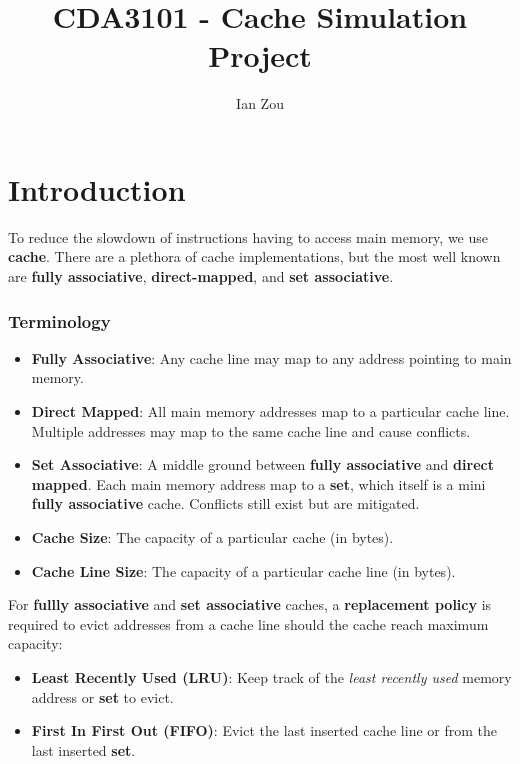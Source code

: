 \documentclass[12pt, letterpaper]{article}
\title{CDA3101 - Cache Simulation Project}
\author{Ian Zou}
\begin{document}
\maketitle

\part{Introduction}

To reduce the slowdown of instructions having to access main memory, we use \textbf{cache}. There are a plethora of cache implementations, but the most well known are \textbf{fully associative}, \textbf{direct-mapped}, and \textbf{set associative}.

\section*{Terminology}

\begin{itemize}
    \item \textbf{Fully Associative}: Any cache line may map to any address pointing to main memory.
    \item \textbf{Direct Mapped}: All main memory addresses map to a particular cache line. Multiple addresses may map to the same cache line and cause conflicts.
    \item \textbf{Set Associative}: A middle ground between \textbf{fully associative} and \textbf{direct mapped}. Each main memory address map to a \textbf{set}, which itself is a mini \textbf{fully associative} cache. Conflicts still exist but are mitigated.
    \item \textbf{Cache Size}: The capacity of a particular cache (in bytes).
    \item \textbf{Cache Line Size}: The capacity of a particular cache line (in bytes).
\end{itemize}
\bigskip

For \textbf{fullly associative} and \textbf{set associative} caches, a \textbf{replacement policy} is required to evict addresses from a cache line should the cache reach maximum capacity:

\begin{itemize}
    \item \textbf{Least Recently Used (LRU)}: Keep track of the \textit{least recently used} memory address or \textbf{set} to evict.
    \item \textbf{First In First Out (FIFO)}: Evict the last inserted cache line or from the last inserted \textbf{set}.
\end{itemize}
\end{document}
